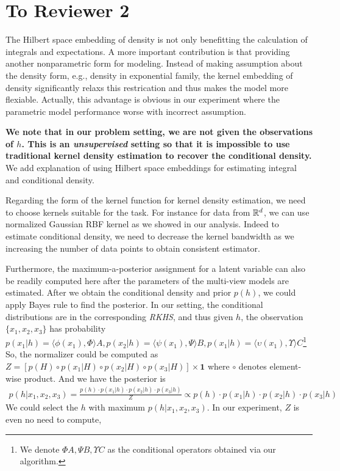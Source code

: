 \documentclass{article}
\newcommand{\bodai}[1]{{\color{violet}{\bf\sf [Dai remark: #1]}}}
\begin{document}
\section*{To Reviewer 2}

The Hilbert space embedding of density is not only benefitting the calculation of integrals and expectations. A more important contribution is that providing another nonparametric form for modeling. Instead of making assumption about the density form, e.g., density in exponential family, the kernel embedding of density significantly relaxs this restrication and thus makes the model more flexiable. Actually, this advantage is obvious in our experiment where the parametric model performance worse with incorrect assumption.


{\bf We note that in our problem setting, we are not given the observations of $h$. This is an \emph{unsupervised} setting so that it is impossible to use traditional kernel density estimation to recover the conditional density.} We add explanation of using Hilbert space embeddings for estimating integral and conditional density.

Regarding the form of the kernel function for kernel density estimation, we need to choose kernels suitable for the task. For instance for data from $\mathbb{R}^d$, we can use normalized Gaussian RBF kernel as we showed in our analysis. Indeed to estimate conditional density, we need to decrease the kernel bandwidth as we increasing the number of data points to obtain consistent estimator.


Furthermore, the maximum-a-posterior assignment for a latent variable can also be readily computed here after the parameters of the multi-view models are estimated. After we obtain the conditional density and prior $p(h)$, we could apply Bayes rule to find the posterior. In our setting, the conditional distributions are in the corresponding \emph{RKHS}, and thus given $h$, the observation $\{x_1,x_2,x_3\}$ has probability $p(x_1|h) = \langle\phi(x_1), \Phi \rangle A, p(x_2|h) = \langle\psi(x_1), \Psi \rangle B, p(x_1|h) = \langle\upsilon(x_1), \Upsilon \rangle C$\footnote{We denote $\Phi A, \Psi B, \Upsilon C$ as the conditional operators obtained via our algorithm.}
So, the normalizer could be computed as $Z = [p(H)\circ p(x_1|H)\circ p(x_2|H)\circ p(x_3|H)] \times \bm{1}$ where $\circ$ denotes element-wise product. And we have the posterior is
%
\begin{eqnarray*}
p(h|x_1, x_2, x_3) = \frac{p(h)\cdot p(x_1|h)\cdot p(x_2|h)\cdot p(x_3|h)}{Z} \propto p(h)\cdot p(x_1|h)\cdot p(x_2|h)\cdot p(x_3|h)
\end{eqnarray*}
%
We could select the $h$ with maximum $p(h|x_1, x_2, x_3)$. In our experiment, $Z$ is even no need to compute,
\end{document}
